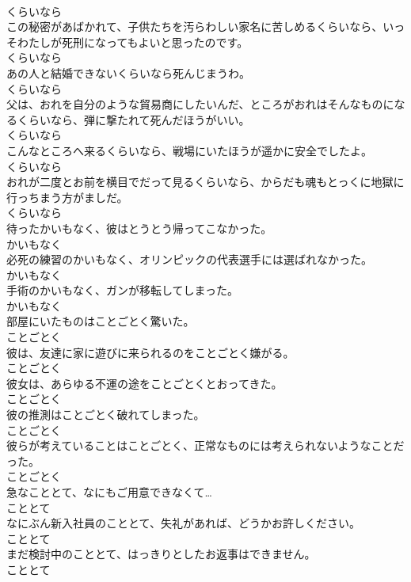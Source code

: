 \documentclass[8pt]{extreport}
\begin{document}
\begin{CJK}{UTF8}{min}
\\	くらいなら
\\	この秘密があばかれて、子供たちを汚らわしい家名に苦しめるくらいなら、いっそわたしが死刑になってもよいと思ったのです。	
\\	くらいなら
\\	あの人と結婚できないくらいなら死んじまうわ。	
\\	くらいなら
\\	父は、おれを自分のような貿易商にしたいんだ、ところがおれはそんなものになるくらいなら、弾に撃たれて死んだほうがいい。	
\\	くらいなら
\\	こんなところへ来るくらいなら、戦場にいたほうが遥かに安全でしたよ。	
\\	くらいなら
\\	おれが二度とお前を横目でだって見るくらいなら、からだも魂もとっくに地獄に行っちまう方がましだ。	
\\	くらいなら
\\	待ったかいもなく、彼はとうとう帰ってこなかった。	
\\	かいもなく
\\	必死の練習のかいもなく、オリンピックの代表選手には選ばれなかった。	
\\	かいもなく
\\	手術のかいもなく、ガンが移転してしまった。	
\\	かいもなく
\\	部屋にいたものはことごとく驚いた。	
\\	ことごとく
\\	彼は、友達に家に遊びに来られるのをことごとく嫌がる。	
\\	ことごとく
\\	彼女は、あらゆる不運の途をことごとくとおってきた。	
\\	ことごとく
\\	彼の推測はことごとく破れてしまった。	
\\	ことごとく
\\	彼らが考えていることはことごとく、正常なものには考えられないようなことだった。	
\\	ことごとく
\\	急なこととて、なにもご用意できなくて…	
\\	こととて
\\	なにぶん新入社員のこととて、失礼があれば、どうかお許しください。	
\\	こととて
\\	まだ検討中のこととて、はっきりとしたお返事はできません。	
\\	こととて

\end{CJK}
\end{document}
